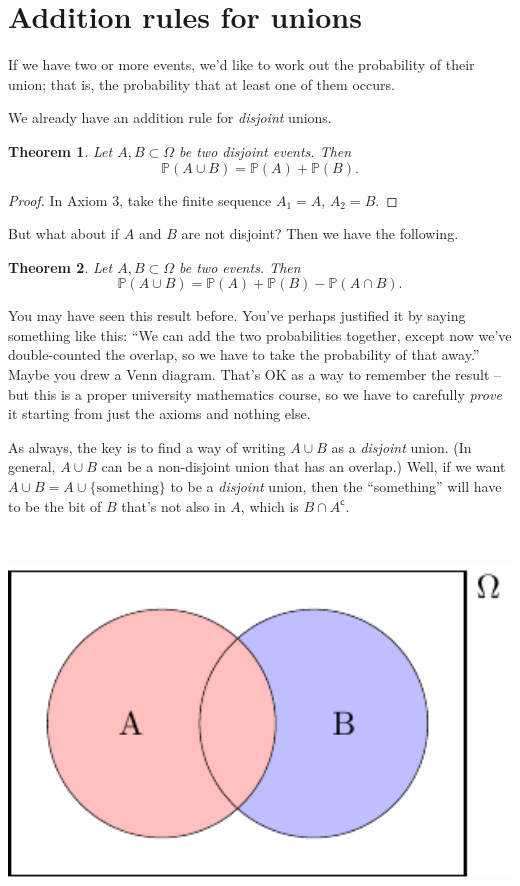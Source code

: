 \documentclass[
  a4paper,
]{book}
\newtheorem{theorem}{Theorem}[chapter]
\theoremstyle{definition}
\theoremstyle{definition}
\theoremstyle{definition}
\theoremstyle{definition}
\theoremstyle{remark}
\begin{document}
\hypertarget{addition}{%
\section{Addition rules for unions}\label{addition}}

If we have two or more events, we'd like to work out the probability of their union; that is, the probability that at least one of them occurs.

We already have an addition rule for \emph{disjoint} unions.

\begin{theorem}
Let \(A, B \subset \Omega\) be two disjoint events. Then
\[ \mathbb P(A \cup B) = \mathbb P(A) + \mathbb P(B) . \]
\end{theorem}

\begin{proof}
In Axiom 3, take the finite sequence \(A_1 = A\), \(A_2 = B\).
\end{proof}

But what about if \(A\) and \(B\) are not disjoint? Then we have the following.

\begin{theorem}
Let \(A, B \subset \Omega\) be two events. Then
\[ \mathbb P(A \cup B) = \mathbb P(A) + \mathbb P(B) - \mathbb P(A \cap B) . \]
\end{theorem}

You may have seen this result before. You've perhaps justified it by saying something like this: ``We can add the two probabilities together, except now we've double-counted the overlap, so we have to take the probability of that away.'' Maybe you drew a Venn diagram. That's OK as a way to remember the result -- but this is a proper university mathematics course, so we have to carefully \emph{prove} it starting from just the axioms and nothing else.

As always, the key is to find a way of writing \(A \cup B\) as a \emph{disjoint} union. (In general, \(A \cup B\) can be a non-disjoint union that has an overlap.) Well, if we want \(A \cup B = A \cup \{\text{something}\}\) to be a \emph{disjoint} union, then the ``something'' will have to be the bit of \(B\) that's not also in \(A\), which is \(B \cap A^\mathsf{c}\).

~

\begin{center}\includegraphics[width=1000pt]{math1710_files/figure-latex/add1-1} \end{center}
\end{document}
